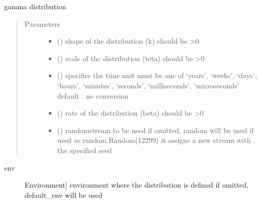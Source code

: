 \documentclass[letterpaper,10pt,english]{sphinxmanual}
\begin{document}
\begin{fulllineitems}
\label{\detokenize{Reference:salabim.Gamma}}
gamma distribution
\begin{quote}\begin{description}
\item[{Parameters}] \leavevmode\begin{itemize}
\item {} 
 () \textendash{} shape of the distribution (k) 
should be \textgreater{}0

\item {} 
 () \textendash{} scale of the distribution (teta) 
should be \textgreater{}0

\item {} 
 () \textendash{} specifies the time unit 
must be one of ‘years’, ‘weeks’, ‘days’, ‘hours’, ‘minutes’, ‘seconds’, ‘milliseconds’, ‘microseconds’ 
default : no conversion 

\item {} 
 () \textendash{} rate of the distribution (beta) 
should be \textgreater{}0

\item {} 
 () \textendash{} randomstream to be used 
if omitted, random will be used 
if used as random.Random(12299)
it assigns a new stream with the specified seed

\end{itemize}

\end{description}\end{quote}
\begin{description}
\item[{env}] \leavevmode{[}Environment{]}
environment where the distribution is defined 
if omitted, default\_env will be used


\end{description}
\end{fulllineitems}
\end{document}
